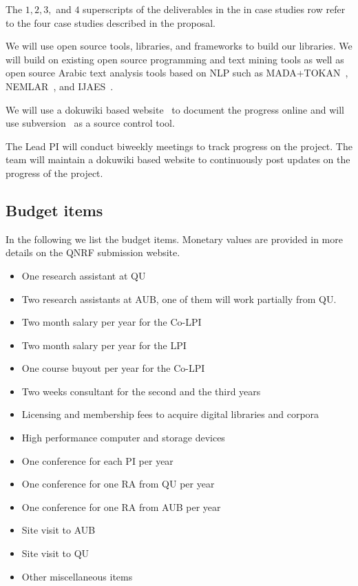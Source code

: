 \documentclass[12pt]{article}
\begin{document}
The $1,2,3,$ and $4$
superscripts of the deliverables in the 
in case studies row refer to the four 
case studies described in the proposal. 

We will use open source tools, libraries, and frameworks to 
build our libraries.
We will build on existing open source programming and text 
mining tools as well as open source Arabic text analysis tools 
based on NLP such as MADA+TOKAN~\cite{Rot08}, 
NEMLAR~\cite{RAl09}, and IJAES~\cite{Int09}.

We will use a dokuwiki based website~\cite{Dok09} 
to document the progress online and will use 
subversion~\cite{Sub09} as a source control tool.
 
The Lead PI will conduct biweekly meetings to track progress 
on the project.
The team will maintain a dokuwiki based website to continuously 
post updates on the progress of the project.


\subsection{Budget items}

In the following we list the budget items. 
Monetary values are provided in more details on the QNRF 
submission website. 

\begin{itemize}
\item One research assistant at QU
\item Two research assistants at AUB, one of them will 
work partially from QU. 
\item Two month salary per year for the Co-LPI
\item Two month salary per year for the LPI
\item One course buyout per year for the Co-LPI
\item Two weeks consultant for the second and the third years
\item Licensing and membership fees to acquire digital libraries and corpora
\item High performance computer and storage devices
\item One conference for each PI per year
\item One conference for one RA from QU per year
\item One conference for one RA from AUB per year
\item Site visit to AUB 
\item Site visit to QU 
\item Other miscellaneous items
\end{itemize}
\end{document}

